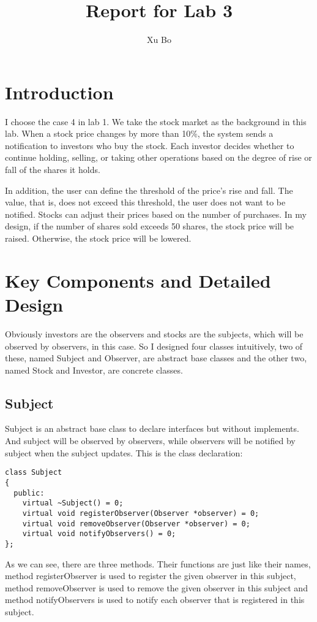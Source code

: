 \documentclass{article}
\title{Report for Lab 3}
\author{Xu Bo}
\date{}
\begin{document}
	\maketitle

\section{Introduction}
    I choose the case 4 in lab 1. We take the stock market as the background in this lab. When a stock price changes by more than 10\%, the system sends a notification to investors who buy the stock. Each investor decides whether to continue holding, selling, or taking other operations based on the degree of rise or fall of the shares it holds.

    In addition, the user can define the threshold of the price's rise and fall. The value, that is, does not exceed this threshold, the user does not want to be notified. Stocks can adjust their prices based on the number of purchases. In my design, if the number of shares sold exceeds 50 shares, the stock price will be raised. Otherwise, the stock price will be lowered.

\section{Key Components and Detailed Design}
    Obviously investors are the observers and stocks are the subjects, which will be observed by observers, in this case. So I designed four classes intuitively, two of these, named Subject and Observer, are abstract base classes and the other two, named Stock and Investor, are concrete classes.

\subsection{Subject}
    Subject is an abstract base class to declare interfaces but without implements. And subject will be observed by observers, while observers will be notified by subject when the subject updates. This is the class declaration:

\begin{lstlisting}
class Subject
{
  public:
    virtual ~Subject() = 0;
    virtual void registerObserver(Observer *observer) = 0;
    virtual void removeObserver(Observer *observer) = 0;
    virtual void notifyObservers() = 0;
};
\end{lstlisting}

    As we can see, there are three methods. Their functions are just like their names, method registerObserver is used to register the given observer in this subject, method removeObserver is used to remove the given observer in this subject and method notifyObservers is used to notify each observer that is registered in this subject.
\end{document}
